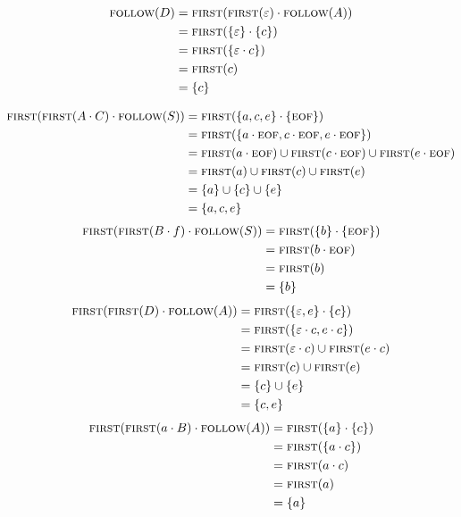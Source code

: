 \documentclass{report}
\newcommand{\Null}{\varepsilon}
\newcommand{\Seq}{\cdot}
\newcommand{\FIRST}{\textsc{first}}
\newcommand{\FOLLOW}{\textsc{follow}}
\newcommand{\EOF}{\textsc{eof}}
\newcommand{\NT}[1]{{#1}}
\newcommand{\T}[1]{{#1}}
\begin{document}
      \begin{align*}
        \FOLLOW(\NT{D}) &= \FIRST(\FIRST(\Null) \Seq \FOLLOW(\NT{A})) \\
        &= \FIRST(\{\Null\} \Seq \{\T{c}\})\\
        &= \FIRST(\{\Null \Seq \T{c}\})\\
        &= \FIRST(\T{c}) \\
        &= \{\T{c}\}
      \end{align*}

      \begin{align*}
        \FIRST(\FIRST(\NT{A} \Seq \NT{C}) \Seq \FOLLOW(\NT{S})) &= \FIRST(\{\T{a}, \T{c}, \T{e}\} \Seq \{\EOF\})\\
        &= \FIRST(\{\T{a} \Seq \EOF, \T{c} \Seq \EOF, \T{e} \Seq \EOF\})\\
        &= \FIRST(\T{a} \Seq \EOF) \cup \FIRST(\T{c} \Seq \EOF) \cup \FIRST(\T{e} \Seq \EOF)\\
        &= \FIRST(\T{a}) \cup \FIRST(\T{c}) \cup \FIRST(\T{e})\\
        &= \{\T{a}\} \cup \{\T{c}\} \cup \{\T{e}\}\\
        &= \{\T{a}, \T{c}, \T{e}\}
      \end{align*}
      \begin{align*}
        \FIRST(\FIRST(\NT{B} \Seq \T{f}) \Seq \FOLLOW(\NT{S})) &= \FIRST(\{\T{b}\} \Seq \{\EOF\})\\
        &= \FIRST(\T{b} \Seq \EOF)\\
        &= \FIRST(\T{b}) \\ 
        &= \{\T{b}\} 
      \end{align*}
      \begin{align*}
        \FIRST(\FIRST(\NT{D}) \Seq \FOLLOW(\NT{A})) &= \FIRST(\{\Null, \T{e}\} \Seq \{\T{c}\})\\
        &= \FIRST(\{\Null \Seq \T{c}, \T{e} \Seq \T{c}\})\\
        &= \FIRST(\Null \Seq \T{c}) \cup \FIRST(\T{e} \Seq \T{c})\\
        &= \FIRST(\T{c}) \cup \FIRST(\T{e})\\
        &= \{\T{c}\} \cup \{\T{e}\}\\
        &= \{\T{c}, \T{e}\}
      \end{align*}
      \begin{align*}
        \FIRST(\FIRST(\T{a} \Seq \NT{B}) \Seq \FOLLOW(\NT{A})) &= \FIRST(\{\T{a}\} \Seq \{\T{c}\})\\
        &= \FIRST(\{\T{a} \Seq \T{c}\})\\
        &= \FIRST(\T{a} \Seq \T{c})\\ 
        &= \FIRST(\T{a})\\
        &= \{\T{a}\}
      \end{align*}
\end{document}
